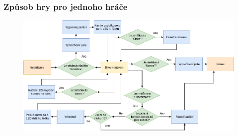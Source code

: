 \documentclass[%
  12pt,       				%
	t,                  %
	aspectratio=1610,   %
	unicode,						%
]{beamer}				    	%
\begin{document}
\begin{frame} 
	\frametitle{Způsob hry pro jednoho hráče}
	\begin{figure}%
		\centering
		\includegraphics[width=1\columnwidth]{obrazky/vyvojovy_diagram_prezentace.png}
	\end{figure}%
\end{frame}
\end{document}
